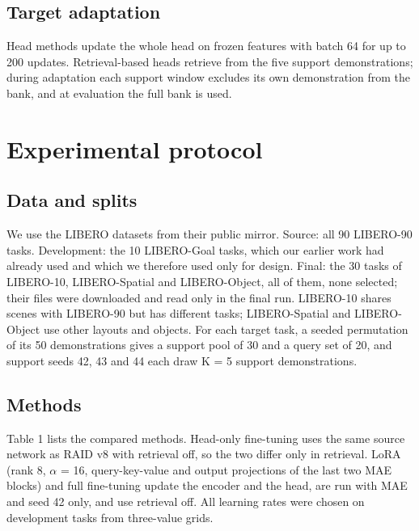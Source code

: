 \documentclass[10pt,twocolumn,letterpaper]{article}
\begin{document}
\subsection{Target adaptation}

Head methods update the whole head on frozen features with batch 64 for up to 200 updates. Retrieval-based heads retrieve from the five support demonstrations; during adaptation each support window excludes its own demonstration from the bank, and at evaluation the full bank is used.

\section{Experimental protocol}

\subsection{Data and splits}

We use the LIBERO datasets \cite{ref9} from their public mirror. Source: all 90 LIBERO-90 tasks. Development: the 10 LIBERO-Goal tasks, which our earlier work had already used and which we therefore used only for design. Final: the 30 tasks of LIBERO-10, LIBERO-Spatial and LIBERO-Object, all of them, none selected; their files were downloaded and read only in the final run. LIBERO-10 shares scenes with LIBERO-90 but has different tasks; LIBERO-Spatial and LIBERO-Object use other layouts and objects. For each target task, a seeded permutation of its 50 demonstrations gives a support pool of 30 and a query set of 20, and support seeds 42, 43 and 44 each draw K = 5 support demonstrations.

\subsection{Methods}

Table 1 lists the compared methods. Head-only fine-tuning uses the same source network as RAID v8 with retrieval off, so the two differ only in retrieval. LoRA (rank 8, \ensuremath{\alpha} = 16, query-key-value and output projections of the last two MAE blocks) and full fine-tuning update the encoder and the head, are run with MAE and seed 42 only, and use retrieval off. All learning rates were chosen on development tasks from three-value grids.
\end{document}
